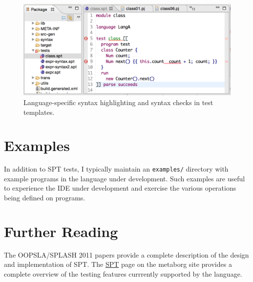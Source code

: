 \begin{figure}[t]
\includegraphics[width=\hsize]{tests/class-spt.pdf}
\caption{Language-specific syntax highlighting and syntax checks in test
templates.}
\end{figure}


\section{Examples}

In addition to SPT tests, I typically maintain an \texttt{examples/} directory
with example programs in the language under development. Such examples are
useful to experience the IDE under development and exercise the various
operations being defined on programs.

\section{Further Reading}

The OOPSLA/SPLASH 2011 papers \cite{KatsVV11,KatsVV11a} provide a complete
description of the design and implementation of SPT.
The \href{http://metaborg.org/spt/}{SPT} page on the metaborg site provides a
complete overview of the testing features currrently supported by the
language.


